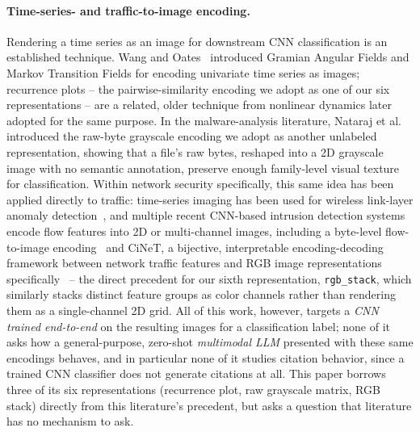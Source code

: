\documentclass[11pt]{article}
\begin{document}
\paragraph{Time-series- and traffic-to-image encoding.} Rendering a time series as an image for
downstream CNN classification is an established technique. Wang and Oates~\cite{wang2015gaf}
introduced Gramian Angular Fields and Markov Transition Fields for encoding univariate time series
as images; recurrence plots -- the pairwise-similarity encoding we adopt as one of our six
representations -- are a related, older technique from nonlinear dynamics later adopted for the
same purpose. In the malware-analysis literature, Nataraj et al.~\cite{nataraj2011malware}
introduced the raw-byte grayscale encoding we adopt as another unlabeled representation, showing
that a file's raw bytes, reshaped into a 2D grayscale image with no semantic annotation, preserve
enough family-level visual texture for classification. Within network security specifically, this
same idea has been applied directly to traffic: time-series imaging has been used for wireless
link-layer anomaly detection~\cite{wirelessimaging2021}, and multiple recent CNN-based intrusion
detection systems encode flow features into 2D or multi-channel images, including a byte-level
flow-to-image encoding~\cite{byteflow2026} and CiNeT, a bijective, interpretable
encoding-decoding framework between network traffic features and RGB image representations
specifically~\cite{bijective2025} -- the direct precedent for our sixth representation,
\texttt{rgb\_stack}, which similarly stacks distinct feature groups as color channels rather than
rendering them as a single-channel 2D grid. All of this work, however, targets a \emph{CNN trained
end-to-end} on the resulting images for a classification label; none of it asks how a
general-purpose, zero-shot \emph{multimodal LLM} presented with these same encodings behaves, and
in particular none of it studies citation behavior, since a trained CNN classifier does not
generate citations at all. This paper borrows three of its six representations (recurrence plot,
raw grayscale matrix, RGB stack) directly from this literature's precedent, but asks a question
that literature has no mechanism to ask.
\end{document}
